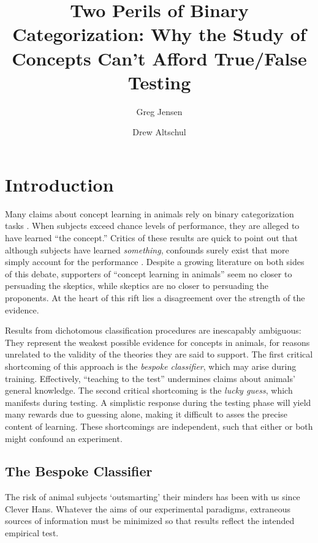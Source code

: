 \documentclass[fleqn,10pt]{wlpeerj_noabs}
\author[1]{Greg Jensen}
\author[2]{Drew Altschul}
\affil[1]{Department of Psychology, Columbia University, New York , NY, USA}
\affil[2]{Department of Psychology, University of Edinburgh, Edinburgh, United Kingdom}
\begin{document}
\title{Two Perils of Binary Categorization: Why the Study of Concepts Can't Afford True/False Testing}

\flushbottom
\maketitle
\thispagestyle{empty}

\section*{Introduction}

Many claims about concept learning in animals rely on binary categorization tasks \citep{Herr1976, Free2001, Mars2008}. When subjects exceed chance levels of performance, they are alleged to have learned ``the concept.'' Critics of these results are quick to point out that although subjects have learned \textsl{something}, confounds surely exist that more simply account for the performance \citep{Katz2007, Wrig2010, Zent2014}. Despite a growing literature on both sides of this debate, supporters of ``concept learning in animals'' seem no closer to persuading the skeptics, while skeptics are no closer to persuading the proponents. At the heart of this rift lies a disagreement over the strength of the evidence.

Results from dichotomous classification procedures are inescapably ambiguous: They represent the weakest possible evidence for concepts in animals, for reasons unrelated to the validity of the theories they are said to support. The first critical shortcoming of this approach is the \textsl{bespoke classifier}, which may arise during training. Effectively, ``teaching to the test'' undermines claims about animals' general knowledge. The second critical shortcoming is the \textsl{lucky guess}, which manifests during testing. A simplistic response during the testing phase will yield many rewards due to guessing alone, making it difficult to asses the precise content of learning. These shortcomings are independent, such that either or both might confound an experiment.

\subsection*{The Bespoke Classifier}

The risk of animal subjects `outsmarting' their minders has been with us since Clever Hans. Whatever the aims of our experimental paradigms, extraneous sources of information must be minimized so that results reflect the intended empirical test.
\end{document}
